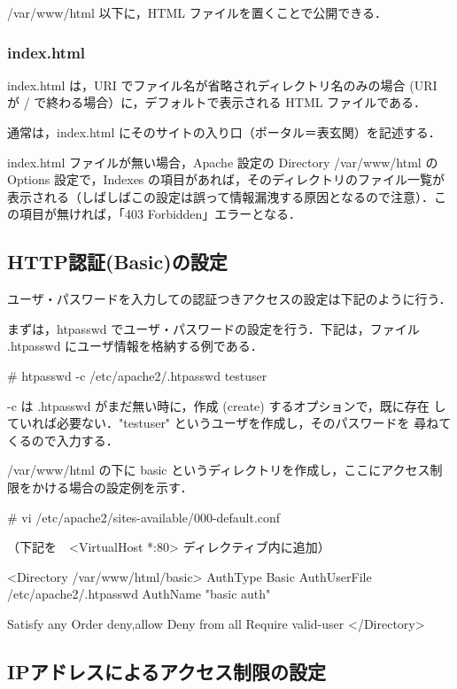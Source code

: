 /var/www/html 以下に，HTML ファイルを置くことで公開できる．

\subsubsection*{index.html}

index.html は，URI でファイル名が省略されディレクトリ名のみの場合 (URI
が / で終わる場合）に，デフォルトで表示される HTML ファイルである．

通常は，index.html にそのサイトの入り口（ポータル＝表玄関）を記述する．

index.html ファイルが無い場合，Apache 設定の Directory /var/www/html の 
Options 設定で，Indexes の項目があれば，そのディレクトリのファイル一覧が
表示される（しばしばこの設定は誤って情報漏洩する原因となるので注意）．こ
の項目が無ければ，「403 Forbidden」エラーとなる．

\subsection{HTTP認証(Basic)の設定}

ユーザ・パスワードを入力しての認証つきアクセスの設定は下記のように行う．

まずは，htpasswd でユーザ・パスワードの設定を行う．下記は，ファイル 
.htpasswd にユーザ情報を格納する例である．

\begin{cli}
# htpasswd -c /etc/apache2/.htpasswd testuser
\end{cli}

-c は .htpasswd がまだ無い時に，作成 (create) するオプションで，既に存在
   していれば必要ない．"testuser" というユーザを作成し，そのパスワードを
   尋ねてくるので入力する．

/var/www/html の下に basic というディレクトリを作成し，ここにアクセス制
限をかける場合の設定例を示す．

\begin{cli}
# vi /etc/apache2/sites-available/000-default.conf

（下記を　<VirtualHost *:80> ディレクティブ内に追加）

<Directory /var/www/html/basic>
        AuthType Basic
        AuthUserFile /etc/apache2/.htpasswd
        AuthName "basic auth"
        
        Satisfy any
        Order deny,allow
        Deny from all
        Require valid-user
</Directory>
\end{cli}

\subsection{IPアドレスによるアクセス制限の設定}

